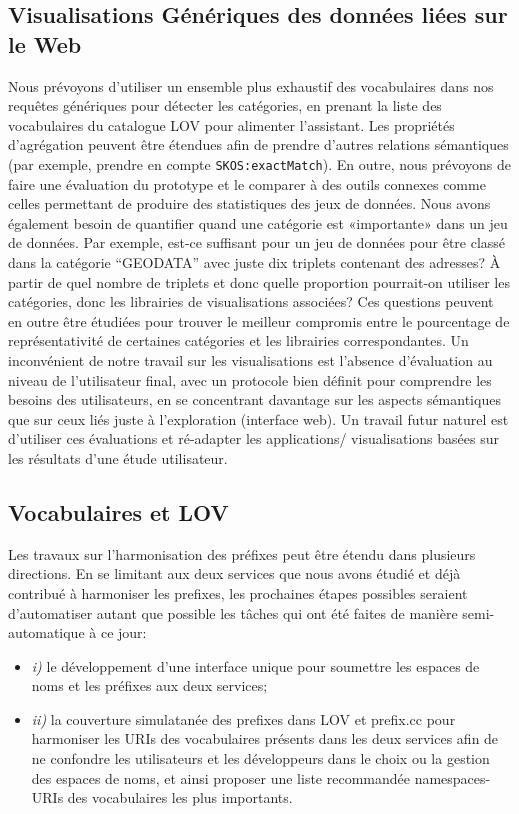 \documentclass[a4paper,11pt,twoside]{report}
\begin{document}
\subsection*{ Visualisations Génériques des données liées sur le Web}


Nous prévoyons d'utiliser un ensemble plus exhaustif des vocabulaires dans nos requêtes génériques pour détecter les catégories, en prenant la liste des vocabulaires du catalogue LOV pour alimenter l'assistant. Les propriétés d'agrégation peuvent être étendues afin de prendre d'autres relations sémantiques (par exemple, prendre en compte \texttt{SKOS:exactMatch}). En outre, nous prévoyons de faire une évaluation du prototype et le comparer à des outils connexes comme celles permettant de produire des statistiques des jeux de données. Nous avons également besoin de quantifier quand une catégorie est «importante» dans un jeu de données. Par exemple, est-ce suffisant pour un jeu de données pour être classé dans la catégorie ``GEODATA'' avec juste dix triplets contenant des adresses? À partir de quel nombre de triplets et donc quelle proportion pourrait-on utiliser les catégories, donc les librairies de visualisations associées? Ces questions peuvent en outre être étudiées pour trouver le meilleur compromis entre le pourcentage de représentativité de certaines catégories et les librairies correspondantes. Un  inconvénient de notre travail sur les visualisations est l'absence d'évaluation au niveau de l'utilisateur final, avec un protocole bien définit pour comprendre les besoins des utilisateurs, en se concentrant davantage sur les aspects sémantiques que sur ceux liés juste à l'exploration (interface web). Un travail futur naturel est d'utiliser ces évaluations et ré-adapter les applications/ visualisations basées sur les résultats d'une étude utilisateur.

 
\subsection*{Vocabulaires et LOV}
\label{sec:nextSteps}

Les travaux sur l'harmonisation des préfixes peut être étendu dans plusieurs directions. En se limitant aux deux services que nous avons étudié et déjà contribué à harmoniser les prefixes, les prochaines étapes possibles seraient d'automatiser autant que possible les tâches qui ont été faites de manière semi-automatique à ce jour:

\begin{itemize}
\item \emph{i)}
le développement d'une interface unique pour soumettre les espaces de noms et les préfixes aux deux services;

\item \emph{ii)} 
la couverture simulatanée des prefixes dans LOV et prefix.cc pour harmoniser les URIs des vocabulaires présents dans les deux services afin de ne confondre les utilisateurs et les développeurs dans le choix ou la gestion des espaces de noms, et ainsi proposer une liste recommandée namespaces-URIs des vocabulaires les plus importants.

\end{itemize}  
\end{document}
